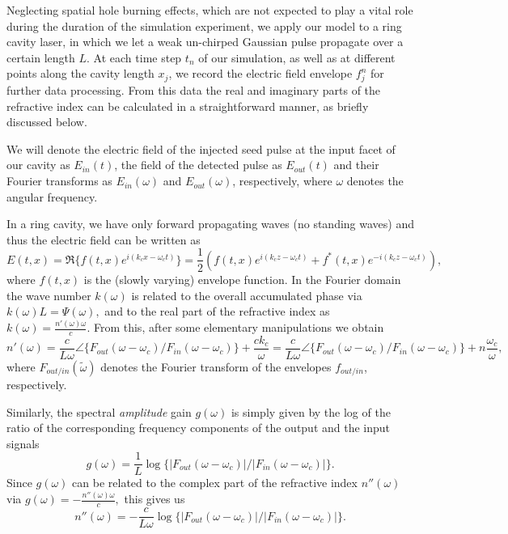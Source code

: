 \documentclass[twocolumn,secnumarabic,amssymb, nobibnotes, aps, prd]{revtex4-1}
\begin{document}
{			Neglecting spatial hole burning effects, which are not expected to play a vital role during the duration of the simulation experiment, we apply our model to a ring cavity laser, in which we let a weak un-chirped Gaussian pulse propagate over a certain length $L$. At each time step $t_n$ of our simulation, as well as at different points along the cavity length $x_j$, we record the electric field envelope $f_j^{n}$ for further data processing. From this data the real and imaginary parts of the refractive index can be calculated in a straightforward manner, as briefly discussed below. 
			
			We will denote the electric field of the injected seed pulse at the input facet of our cavity as $E_{in}(t)$, the field of the detected pulse as $E_{out}(t)$ and their Fourier transforms as $E_{in}(\omega)$ and $E_{out}(\omega)$, respectively, where $\omega$ denotes the angular frequency.
			
			In a ring cavity, we have only forward propagating waves (no standing waves) and thus the electric field can be written as
			\begin{equation}
			E(t,x) = \Re\{f(t,x)e^{i (k_c x - \omega_c t) }\} = \frac{1}{2} \left ( f(t,x)e^{i (k_c z - \omega_c t)} +f^*(t,x) e^{-i (k_c z - \omega_c t) }\right) ,
			\end{equation}
			where $f(t,x)$ is the (slowly varying) envelope function. In the Fourier domain the wave number  $k(\omega)$ is related to the overall accumulated phase via $k(\omega)L = \Psi(\omega),$ and to the real part of the refractive index as 
			$k(\omega) =  \frac{n'(\omega)\omega}{c}.$ From this, after some elementary manipulations we obtain 
			\begin{equation}
			n'(\omega) = \frac{c}{L \omega }\angle\{F_{out}(\omega-\omega_c)/F_{in}(\omega-\omega_c)\}+\frac{ck_c}{\omega} = \frac{c}{L\omega }\angle\{F_{out}(\omega-\omega_c)/F_{in}(\omega-\omega_c)\}+n\frac{\omega_c}{\omega},
			\end{equation}
			where $F_{out/in}(\tilde\omega)$ denotes the Fourier transform of the envelopes $f_{out/in}$, respectively. 
			
			Similarly, the spectral \emph{amplitude} gain $g(\omega)$ is simply given by the log of the ratio of the corresponding frequency components of the output and the input signals
			\begin{equation}
			\label{eq:gaineq}
			g(\omega) = \frac{1}{L} \log\{|F_{out}(\omega-\omega_c)|/|F_{in}(\omega-\omega_c)|\}.
			\end{equation}
			Since $g(\omega)$ can be related to the complex part of the refractive index $n''(\omega)$ via
			$
			g(\omega) = -\frac{n''(\omega)\omega}{c}, 
			$
			this gives us
			\begin{equation}
			n''(\omega) = -\frac{c}{L\omega}\log\{|F_{out}(\omega-\omega_c)|/|F_{in}(\omega-\omega_c)|\}.
			\end{equation}
			
}
\end{document}
